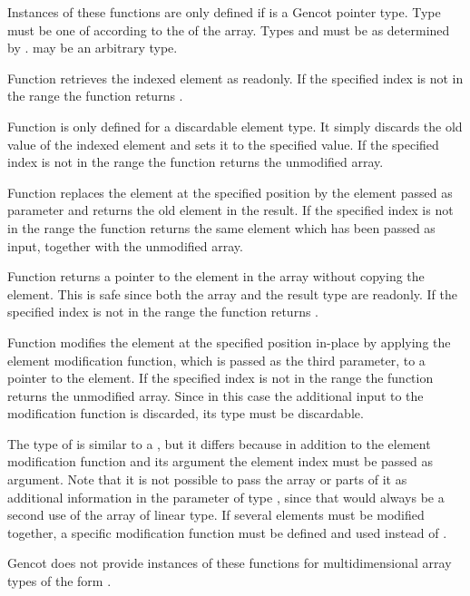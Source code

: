 Instances of these functions are only defined if  is a Gencot pointer type. Type 
must be one of  according to the  of the array. Types  and
 must be as determined by .  may be an arbitrary type.

Function  retrieves the indexed element as readonly. If the specified index 
is not in the range  the function returns .

Function  is only defined for a discardable element type. 
It simply discards the old value of the indexed element and sets it to the specified value.
If the specified index is not in the range  the function returns the unmodified array.

Function 
replaces the element at the specified position by the element passed as parameter and returns the old element in the result.
If the specified
index is not in the range  the function returns the same element which has been
passed as input, together with the unmodified array. 

Function  returns a pointer to the element in the array without copying the element. This is safe since 
both the array and the result
type are readonly. If the specified index is not in the range  the function returns . 

Function  modifies the element at the specified position in-place by applying the element modification function,
which is passed as the third parameter, to a pointer to the element. 
If the specified
index is not in the range  the function returns the unmodified array. Since in this case the 
additional input to the modification function is discarded, its type  must be discardable.

The type of  is similar to a , but it differs because in addition to the element modification 
function and its argument the element index must be passed as argument.
Note that it is not possible
to pass the array or parts of it as additional information in the parameter of type , since that would always be
a second use of the array of linear type. If several elements must be modified together, a specific modification function
must be defined and used instead of .

Gencot does not provide instances of these functions for multidimensional array types of the form .

